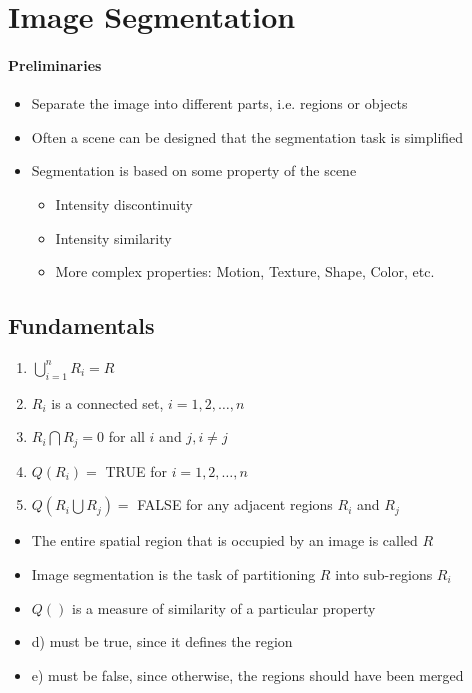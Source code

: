 \section{Image Segmentation}
\paragraph{Preliminaries}
\begin{itemize}
\item Separate the image into different parts, i.e. regions or objects
\item Often a scene can be designed that the segmentation task is simplified
\item Segmentation is based on some property of the scene
\begin{itemize}
\item Intensity discontinuity
\item Intensity similarity
\item More complex properties: Motion, Texture, Shape, Color, etc.
\end{itemize}
\end{itemize}

\subsection{Fundamentals}
\begin{multicols}{2}
\begin{enumerate}[label={\alph*)}]
\item $\bigcup\limits_{i=1}^{n}R_i=R$
\item $R_i$ is a connected set, $i=1,2,\dots ,n$
\item $R_i\bigcap R_j = 0$ for all $i$ and $j, i\neq j$
\item $Q(R_i)=$ TRUE for $i=1,2,\dots ,n$
\item $Q(R_i\bigcup R_j)=$ FALSE for any adjacent regions $R_i$ and $R_j$
\end{enumerate}
\vfill
\columnbreak
\begin{itemize}
\item The entire spatial region that is occupied by an image is called $R$
\item Image segmentation is the task of partitioning $R$ into sub-regions $R_i$
\item $Q()$ is a measure of similarity of a particular property
\item d) must be true, since it defines the region
\item e) must be false, since otherwise, the regions should have been merged
\end{itemize}
\end{multicols}

